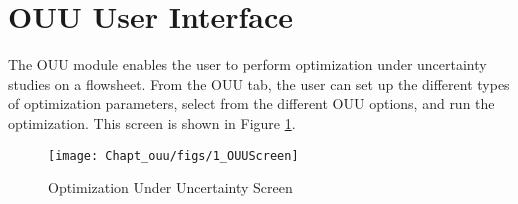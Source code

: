 \section{OUU User Interface}

The OUU module enables the user to perform optimization under uncertainty studies 
on a flowsheet. From the OUU tab, the user can set up the different types of
optimization parameters, select from the different OUU options, and run the 
optimization. This screen is shown in Figure \ref{fig:ouu_screen}.

\begin{figure}[H]
\centering \texttt{[image: Chapt\_ouu/figs/1\_OUUScreen]}
\caption{Optimization Under Uncertainty Screen}
\label{fig:ouu_screen}
\end{figure}

